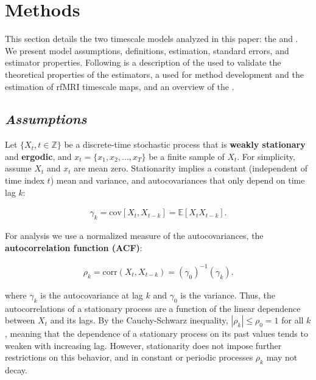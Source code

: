 \documentclass[main.tex]{subfiles}
\begin{document}
\section{Methods}

This section details the two timescale models analyzed in this paper: the  and . We present model assumptions, definitions, estimation, standard errors, and estimator properties. Following is a description of the  used to validate the theoretical properties of the estimators, a  used for method development and the estimation of rfMRI timescale maps, and an overview of the .

\subsection{\textit{Assumptions}} \label{sec:assumptions}

Let $\{X_t, t\in \mathbb{Z}\}$ be a discrete-time stochastic process that is \textbf{weakly stationary} and \textbf{ergodic}, and $x_t = \{x_1, x_2, ..., x_T\}$ be a finite sample of $X_t$. For simplicity, assume $X_t$ and $x_t$ are mean zero. Stationarity implies a constant (independent of time index $t$) mean and variance, and autocovariances that only depend on time lag $k$:

\begin{align} 
    \gamma_k = \text{cov}[X_t, X_{t-k}] = \mathbb{E}[X_t X_{t-k}].
\end{align}

\noindent For analysis we use a normalized measure of the autocovariances, the \textbf{autocorrelation function (ACF)}:

\begin{align} \label{eq:acf}
\rho_k = \text{corr}(X_t, X_{t-k}) = (\gamma_0)^{-1}(\gamma_k).
\end{align}

\noindent where $\gamma_k$ is the autocovariance at lag $k$ and $\gamma_0$ is the variance. Thus, the autocorrelations of a stationary process are a function of the linear dependence between $X_t$ and its lags. By the Cauchy-Schwarz inequality, $|\rho_k|\le \rho_0 = 1$ for all $k$, meaning that the dependence of a stationary process on its past values tends to weaken with increasing lag. However, stationarity does not impose further restrictions on this behavior, and in constant or periodic processes $\rho_k$ may not decay. \\
\end{document}
